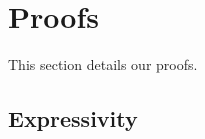 
\section{Proofs}\label{app:proofs}
This section details our proofs.
\subsection{Expressivity}
\setcounter{section}{2}
\setcounter{theorem}{0}
\setcounter{lemma}{0}

